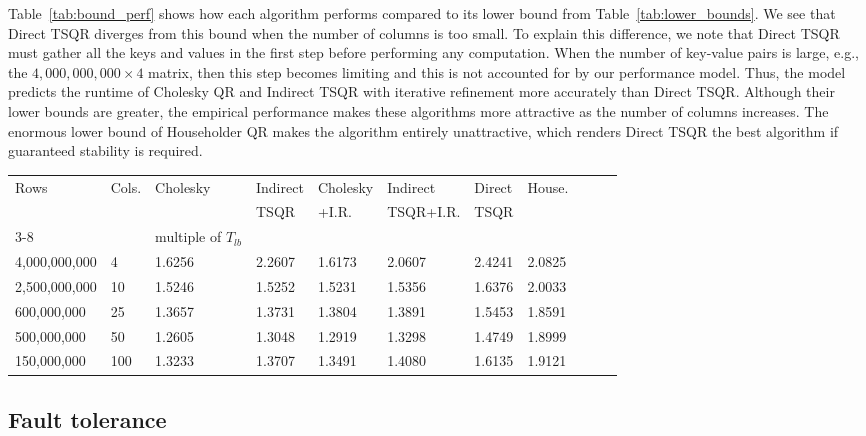 \documentclass[10pt, conference, compsocconf]{IEEEtran}
\begin{document}
Table~\ref{tab:bound_perf} shows how each algorithm performs compared to its lower bound from Table~\ref{tab:lower_bounds}.  We see that Direct TSQR diverges from this bound when the number of columns is too small.  To explain this difference, we note that Direct TSQR must gather all the keys and values in the first step before performing any computation.  When the number of key-value pairs is large, e.g., the $4,000,000,000 \times 4$ matrix, then this step becomes limiting and this is not accounted for by our performance model.
Thus, the model predicts the runtime of Cholesky QR and Indirect TSQR with iterative refinement more accurately than Direct TSQR.  Although their lower bounds are greater, the empirical performance makes these algorithms more attractive as the number of columns increases.  The enormous lower bound of Householder QR makes the algorithm entirely unattractive, which renders Direct TSQR the best algorithm if guaranteed stability is required.

\begin{table*}[tbp]
\vspace{-\baselineskip}
\caption{Performance of algorithms as a multiple of the lower bounds from Table~\ref{tab:lower_bounds}.}
\centering
\begin{tabularx}{\linewidth}{llXXXXXXXXX}
\toprule
Rows               & Cols. & Cholesky & Indirect & Cholesky & Indirect         & Direct & House. \\
                          &           &                   & TSQR   & +I.R.         & TSQR+I.R. & TSQR & \\\cmidrule{3-8}
& & multiple of $T_{lb}$ \\ \midrule
4,000,000,000 & 4 & 1.6256 & 2.2607 & 1.6173 & 2.0607 & 2.4241 & 2.0825 \\
2,500,000,000 & 10 & 1.5246 & 1.5252 & 1.5231 & 1.5356 & 1.6376 & 2.0033 \\
600,000,000    & 25 & 1.3657 & 1.3731 & 1.3804 & 1.3891 & 1.5453 & 1.8591 \\
500,000,000    & 50 & 1.2605 & 1.3048 & 1.2919 & 1.3298 & 1.4749 & 1.8999 \\
150,000,000   & 100 & 1.3233 & 1.3707 & 1.3491 & 1.4080  & 1.6135 & 1.9121 \\
\bottomrule
\end{tabularx}
\label{tab:bound_perf}
\end{table*}


\subsection{Fault tolerance}
\end{document}
